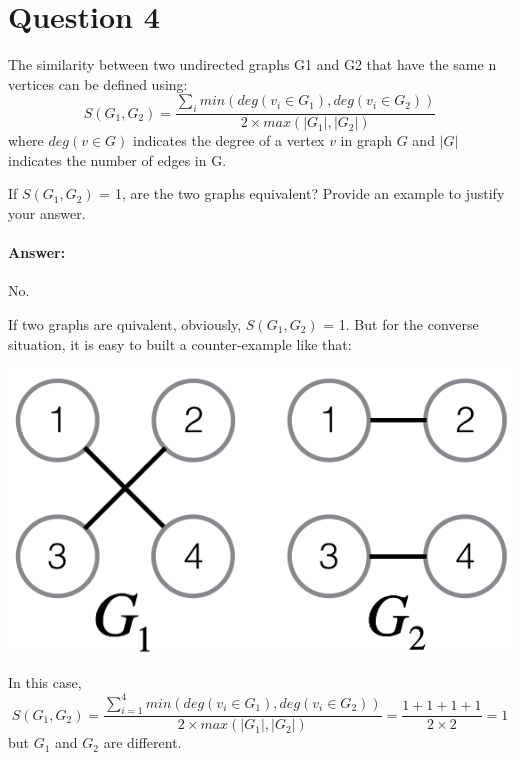 \documentclass{article}
\begin{document}
\section*{Question 4}{
    The similarity between two undirected graphs G1 and G2 that have the same n vertices can be defined using:
    \[\mathit{S(G_1, G_2)}=\frac{\sum_{i}{}min(deg(\mathit{v_i} \in \mathit{G_1}), deg(\mathit{v_i} \in \mathit{G_2}))}{2 \times max(\lvert\mathit{G_1}\rvert,\lvert\mathit{G_2}\rvert)}\]
    where \(\mathit{deg(v \in G)}\) indicates the degree of a vertex $v$ in graph $G$ and $|G|$ indicates the number of edges in G.

    If \(\mathit{S(G_1, G_2)}\) = 1, are the two graphs equivalent? Provide an example to justify your answer.

    \paragraph{Answer: }{
        No.

        If two graphs are quivalent, obviously, 
        \(\mathit{S(G_1, G_2)}\) = 1. But for the converse situation, it is easy to built a counter-example like that:

        \begin{center}{
            \includegraphics{graph.png}
        }
        \end{center}
        
        In this case, 
        \[\mathit{S(G_1, G_2)}=\frac{\sum_{i=1}^{4}min(deg(\mathit{v_i} \in \mathit{G_1}), deg(\mathit{v_i} \in \mathit{G_2}))}{2 \times max(\lvert\mathit{G_1}\rvert,\lvert\mathit{G_2}\rvert)}=\frac{1 + 1 + 1 + 1}{2 \times 2}=1\]
        but \(\mathit{G_1}\) and \(\mathit{G_2}\) are different.
    }
}
\end{document}
